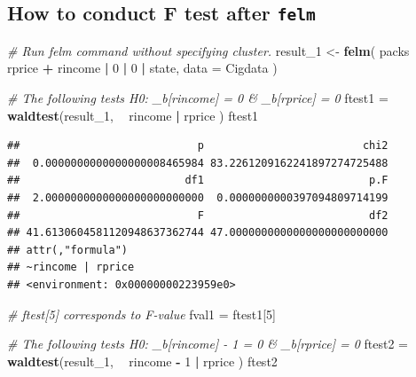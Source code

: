 \documentclass[]{book}
\newenvironment{Shaded}{\begin{snugshade}}{\end{snugshade}}
\newcommand{\KeywordTok}[1]{\textcolor[rgb]{0.13,0.29,0.53}{\textbf{#1}}}
\newcommand{\DataTypeTok}[1]{\textcolor[rgb]{0.13,0.29,0.53}{#1}}
\newcommand{\DecValTok}[1]{\textcolor[rgb]{0.00,0.00,0.81}{#1}}
\newcommand{\StringTok}[1]{\textcolor[rgb]{0.31,0.60,0.02}{#1}}
\newcommand{\CommentTok}[1]{\textcolor[rgb]{0.56,0.35,0.01}{\textit{#1}}}
\newcommand{\OperatorTok}[1]{\textcolor[rgb]{0.81,0.36,0.00}{\textbf{#1}}}
\newcommand{\NormalTok}[1]{#1}
\begin{document}
\subsection{\texorpdfstring{How to conduct F test after
\texttt{felm}}{How to conduct F test after felm}}\label{how-to-conduct-f-test-after-felm}

\begin{Shaded}
\begin{Highlighting}[]
\CommentTok{# Run felm command without specifying cluster.}
\NormalTok{result_}\DecValTok{1}\NormalTok{ <-}\StringTok{ }\KeywordTok{felm}\NormalTok{( packs }\OperatorTok{~}\StringTok{ }\NormalTok{rprice }\OperatorTok{+}\StringTok{ }\NormalTok{rincome  }\OperatorTok{|}\StringTok{ }\DecValTok{0} \OperatorTok{|}\StringTok{ }\DecValTok{0} \OperatorTok{|}\StringTok{ }\NormalTok{state, }\DataTypeTok{data =}\NormalTok{ Cigdata )}


\CommentTok{# The following tests H0: _b[rincome] = 0 & _b[rprice] = 0 }
\NormalTok{ftest1 =}\StringTok{ }\KeywordTok{waldtest}\NormalTok{(result_}\DecValTok{1}\NormalTok{, }\OperatorTok{~}\StringTok{ }\NormalTok{rincome }\OperatorTok{|}\StringTok{ }\NormalTok{rprice  )}
\NormalTok{ftest1 }
\end{Highlighting}
\end{Shaded}

\begin{verbatim}
##                            p                         chi2 
##  0.0000000000000000008465984 83.2261209162241897274725488 
##                          df1                          p.F 
##  2.0000000000000000000000000  0.0000000000397094809714199 
##                            F                          df2 
## 41.6130604581120948637362744 47.0000000000000000000000000 
## attr(,"formula")
## ~rincome | rprice
## <environment: 0x00000000223959e0>
\end{verbatim}

\begin{Shaded}
\begin{Highlighting}[]
\CommentTok{# ftest[5] corresponds to F-value}
\NormalTok{fval1 =}\StringTok{ }\NormalTok{ftest1[}\DecValTok{5}\NormalTok{]}


\CommentTok{# The following tests H0: _b[rincome] - 1 = 0 & _b[rprice] = 0 }
\NormalTok{ftest2 =}\StringTok{ }\KeywordTok{waldtest}\NormalTok{(result_}\DecValTok{1}\NormalTok{, }\OperatorTok{~}\StringTok{ }\NormalTok{rincome }\OperatorTok{-}\StringTok{ }\DecValTok{1} \OperatorTok{|}\StringTok{ }\NormalTok{rprice  )}
\NormalTok{ftest2 }
\end{Highlighting}
\end{Shaded}
\end{document}
